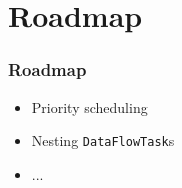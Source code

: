 \documentclass{beamer}
\newcommand{\DFT}{\texttt{DataFlowTasks.jl}}
\begin{document}




\section{Roadmap}



\begin{frame}
\frametitle{Roadmap}  

\begin{itemize}
  \item Priority scheduling
  \item Nesting \texttt{DataFlowTask}s
  \item ...
\end{itemize} 
\end{frame}
\end{document}
